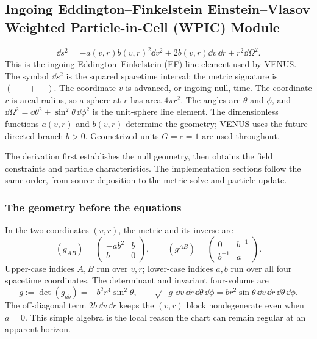 \subsection{Ingoing Eddington--Finkelstein Einstein--Vlasov Weighted
Particle-in-Cell (WPIC) Module}
\label{sec:ingoing-eddington-finkelstein-wpic}

\[
 \boxed{\dd s^2=-a(v,r)b(v,r)^2\dd v^2
          +2b(v,r)\dd v\,\dd r+r^2\dd\Omega^2.}          \tag{IEF2}
\]
This is the ingoing Eddington--Finkelstein (EF) line element used by VENUS.
The symbol \(\dd s^2\) is the squared spacetime interval; the metric signature
is \((-+++)\).  The coordinate \(v\) is advanced, or ingoing-null, time.
The coordinate \(r\) is areal radius, so a sphere at \(r\) has area
\(4\pi r^2\).  The angles are \(\theta\) and \(\phi\), and
\(\dd\Omega^2=\dd\theta^2+\sin^2\theta\,\dd\phi^2\) is the unit-sphere line
element.  The dimensionless functions \(a(v,r)\) and \(b(v,r)\) determine the
geometry; VENUS uses the future-directed branch \(b>0\).  Geometrized units
\(G=c=1\) are used throughout.

The derivation first establishes the null geometry, then obtains the field
constraints and particle characteristics.  The implementation sections follow
the same order, from source deposition to the metric solve and particle
update.

\subsubsection{The geometry before the equations}
\label{sec:ef-geometry-first}

In the two coordinates \((v,r)\), the metric and its inverse are
\[
 (g_{AB})=
 \begin{pmatrix}-ab^2&b\\ b&0\end{pmatrix},\qquad
 (g^{AB})=
 \begin{pmatrix}0&b^{-1}\\ b^{-1}&a\end{pmatrix}.          \tag{IEF3}
\]
Upper-case indices \(A,B\) run over \(v,r\); lower-case indices \(a,b\) run
over all four spacetime coordinates.  The determinant and invariant
four-volume are
\[
 g:=\det(g_{ab})=-b^2r^4\sin^2\theta,\qquad
 \sqrt{-g}\,\dd v\,\dd r\,\dd\theta\,\dd\phi
 =br^2\sin\theta\,\dd v\,\dd r\,\dd\theta\,\dd\phi.       \tag{IEF4}
\]
The off-diagonal term \(2b\,\dd v\,\dd r\) keeps the \((v,r)\) block
nondegenerate even when \(a=0\).  This simple algebra is the local reason the
chart can remain regular at an apparent horizon.

